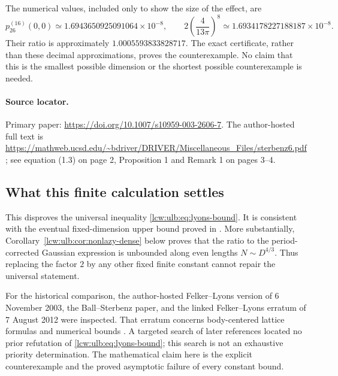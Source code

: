 \documentclass[11pt,letterpaper]{article}
\theoremstyle{remark}\newtheorem{remark}[theorem]{Remark}
\begin{document}
The numerical values, included only to show the size of the effect, are
\[
 p_{26}^{(16)}(0,0)\simeq1.6943650925091064\times10^{-8},\qquad
 2\left(\frac4{13\pi}\right)^8
     \simeq1.6934178227188187\times10^{-8}.
\]
Their ratio is approximately $1.0005593833828717$. The exact
certificate, rather than these decimal approximations, proves the
counterexample. No claim that this is the smallest possible dimension
or the shortest possible counterexample is needed.

\paragraph{Source locator.}
Primary paper: \url{https://doi.org/10.1007/s10959-003-2606-7}.
The author-hosted full text is
\url{https://mathweb.ucsd.edu/~bdriver/DRIVER/Miscellaneous_Files/sterbenz6.pdf};
see equation (1.3) on page 2, Proposition 1 and Remark 1 on pages 3--4.

\subsection{What this finite calculation settles}

This disproves the universal inequality \eqref{lcw:ulb:eq:lyons-bound}.
It is consistent with the eventual fixed-dimension upper bound
proved in \cite{ballsterbenz}. More substantially,
Corollary~\ref{lcw:ulb:cor:nonlazy-dense} below proves that the ratio to the
period-corrected Gaussian expression is unbounded along even lengths
$N\sim D^{4/3}$. Thus replacing the factor $2$ by any other fixed
finite constant cannot repair the universal statement.

For the historical comparison, the author-hosted Felker--Lyons version
of 6 November 2003, the Ball--Sterbenz paper, and the linked
Felker--Lyons erratum of 7 August 2012 were inspected. That erratum
concerns body-centered lattice formulas and numerical bounds
\cite{felkererratum}. A targeted search of later references located
no prior refutation of \eqref{lcw:ulb:eq:lyons-bound}; this search is not an
exhaustive priority determination. The mathematical claim here is the
explicit counterexample and the proved asymptotic failure of every
constant bound.
\end{document}
